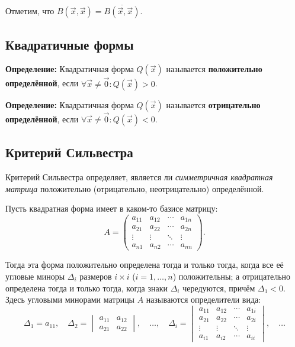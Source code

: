 \documentclass[12pt]{article}
\begin{document}
Отметим, что $B(\vec{x}, \vec{x}) = \overline{B(\vec{x}, \vec{x})}$.



\subsection*{Квадратичные формы}

\textbf{Определение:} Квадратичная форма $Q(\vec{x})$ называется \textbf{положительно определённой}, если $\forall \vec{x} \neq \vec{0}: Q(\vec{x}) > 0$.



\textbf{Определение:} Квадратичная форма $Q(\vec{x})$ называется \textbf{отрицательно определённой}, если $\forall \vec{x} \neq \vec{0}: Q(\vec{x}) < 0$.

\subsection*{Критерий Сильвестра}
Критерий Сильвестра определяет, является ли \textit{симметричная квадратная матрица} положительно (отрицательно, неотрицательно) определённой.

Пусть квадратная форма имеет в каком-то базисе матрицу:
$$
A = 
\begin{pmatrix}
a_{11} & a_{12} & \cdots & a_{1n} \\
a_{21} & a_{22} & \cdots & a_{2n} \\
\vdots & \vdots & \ddots & \vdots \\
a_{n1} & a_{n2} & \cdots & a_{nn}
\end{pmatrix}.
$$

Тогда эта форма положительно определена тогда и только тогда, когда все её угловые миноры $\Delta_i$ размеров $i \times i$ ($i = 1, \dots, n$) положительны; а отрицательно определена тогда и только тогда, когда знаки $\Delta_i$ чередуются, причём $\Delta_1 < 0$. Здесь угловыми минорами матрицы $A$ называются определители вида:
$$
\Delta_1 = a_{11}, \quad 
\Delta_2 = 
\begin{vmatrix}
a_{11} & a_{12} \\
a_{21} & a_{22}
\end{vmatrix}, \quad
\dots, \quad
\Delta_i = 
\begin{vmatrix}
a_{11} & a_{12} & \cdots & a_{1i} \\
a_{21} & a_{22} & \cdots & a_{2i} \\
\vdots & \vdots & \ddots & \vdots \\
a_{i1} & a_{i2} & \cdots & a_{ii}
\end{vmatrix}, \quad \dots
$$
\end{document}
